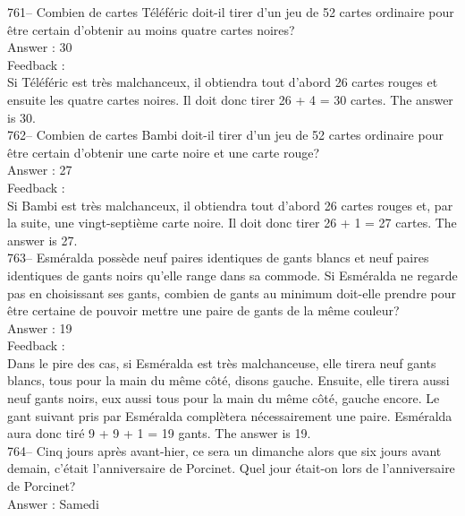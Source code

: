 \documentclass[letterpaper, 12pt]{article}
\begin{document}
761-- Combien de cartes T\'el\'ef\'eric doit-il tirer d'un jeu de 52 cartes
ordinaire pour \^etre certain d'obtenir au moins quatre cartes noires?\\

Answer : 30\\

Feedback : \\
Si T\'el\'ef\'eric est tr\`es malchanceux, il obtiendra tout d'abord 26
cartes rouges et ensuite les quatre cartes noires.  Il doit donc tirer 26 +
4 = 30 cartes.  The answer is 30.\\

762-- Combien de cartes Bambi doit-il tirer d'un jeu de 52 cartes ordinaire
pour \^etre certain d'obtenir une carte noire et une carte rouge?\\

Answer : 27\\

Feedback : \\
Si Bambi est tr\`es malchanceux, il obtiendra tout d'abord 26 cartes rouges
et, par la suite, une vingt-septi\`eme carte noire.  Il doit donc tirer 26 +
1 = 27 cartes. The answer is 27.\\

763-- Esm\'eralda poss\`ede neuf paires identiques de gants blancs et neuf
paires identiques de gants noirs qu'elle range dans sa commode.  Si
Esm\'eralda ne regarde pas en choisissant ses gants, combien de gants au
minimum doit-elle prendre pour \^etre certaine de pouvoir mettre une paire
de gants de la m\^eme couleur?\\

Answer : 19\\

Feedback : \\
Dans le pire des cas, si Esm\'eralda est tr\`es malchanceuse, elle tirera
neuf gants blancs, tous pour la main du m\^eme c\^ot\'e, disons gauche.
Ensuite, elle tirera aussi neuf gants noirs, eux aussi tous pour la main du
m\^eme c\^ot\'e, gauche encore. Le gant suivant pris par Esm\'eralda
compl\`etera n\'ecessairement une paire. Esm\'eralda aura donc tir\'e 9 + 9
+ 1 = 19 gants.  The answer is 19.\\

764-- Cinq jours apr\`es avant-hier, ce sera un dimanche alors que six jours
avant demain, c'\'etait l'anniversaire de Porcinet.  Quel jour \'etait-on
lors de l'anniversaire de Porcinet?\\

Answer : Samedi\\
\end{document}
